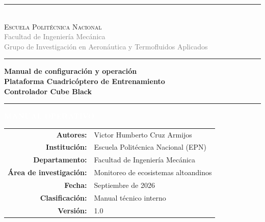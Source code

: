 \documentclass[12pt,a4paper]{article}
\begin{document}
\begin{titlepage}
    \centering
    
    \vspace*{1cm}
    \textcolor{epnblue}{\rule{\textwidth}{1pt}}\\[0.3cm]
    \textcolor{epnblue}{\textsc{\Large Escuela Politécnica Nacional}}\\[0.15cm]
    \textcolor{graytext}{\small Facultad de Ingeniería Mecánica}\\[0.1cm]
    \textcolor{graytext}{\small Grupo de Investigación en Aeronáutica y Termofluidos Aplicados}\\[0.2cm]
    \textcolor{epnblue}{\rule{\textwidth}{0.5pt}}
    
    \vspace{2.5cm}
    
    \textcolor{epnblue}{\Large \bfseries Manual de configuración y operación}\\[0.2cm]
    \textcolor{epnblue}{\Large \bfseries Plataforma Cuadricóptero de Entrenamiento}\\[0.2cm]
    \textcolor{epnblue}{\Large \bfseries Controlador Cube Black}
    
    \vspace{1cm}
    
    \textcolor{epngold}{\rule{4cm}{1pt}}
    
    \vspace{1cm}
    
    {\setlength{\fboxsep}{12pt}%
    \colorbox{epnblue}{\textcolor{white}{\enskip \textbf{MANUAL OPERATIVO} \enskip}}}
    
    \vspace{2cm}
    
    \begin{table}[H]
        \centering
        \small
        \renewcommand{\arraystretch}{1.3}
        \begin{tabular}{rl}
            \textbf{Autores:} & Victor Humberto Cruz Armijos \\
            \textbf{Institución:} & Escuela Politécnica Nacional (EPN) \\
            \textbf{Departamento:} & Facultad de Ingeniería Mecánica \\
            \textbf{Área de investigación:} & Monitoreo de ecosistemas altoandinos \\
            \textbf{Fecha:} & Septiembre de 2026 \\
            \textbf{Clasificación:} & Manual técnico interno \\
            \textbf{Versión:} & 1.0 \\
        \end{tabular}
    \end{table}
    

\end{titlepage}
\end{document}
